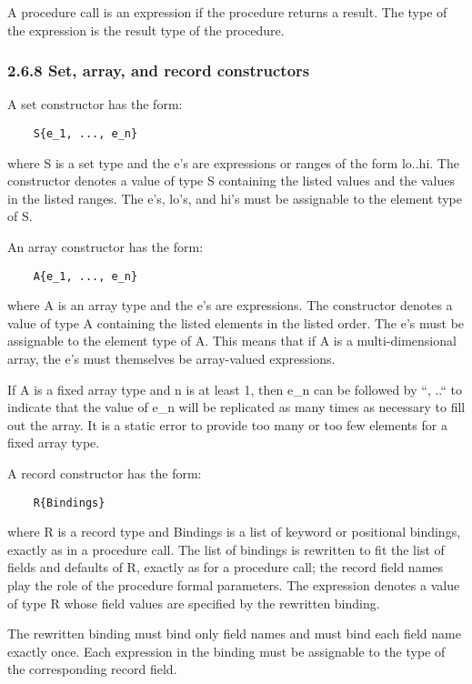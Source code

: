 \documentclass[10pt]{article}
\begin{document}
  A procedure call is an expression if the procedure returns a result. The type of the expression is the result type of the procedure. 


 
\subsubsection*{2.6.8 Set, array, and record constructors}


  A set constructor has the form: 
\begin{verbatim}
    S{e_1, ..., e_n}
\end{verbatim}
 where S is a set type and the e's are expressions or ranges of the form lo..hi. The constructor denotes a value of type S containing the listed values and the values in the listed ranges. The e's, lo's, and hi's must be assignable to the element type of S. 


 An array constructor has the form: 
\begin{verbatim}
    A{e_1, ..., e_n}
\end{verbatim}
 where A is an array type and the e's are expressions. The constructor denotes a value of type A containing the listed elements in the listed order. The e's must be assignable to the element type of A. This means that if A is a multi-dimensional array, the e's must themselves be array-valued expressions. 


  If A is a fixed array type and n is at least 1, then e\_n can be followed by ``, ..`` to indicate that the value of e\_n will be replicated as many times as necessary to fill out the array. It is a static error to provide too many or too few elements for a fixed array type. 


 A record constructor has the form: 
\begin{verbatim}
    R{Bindings}
\end{verbatim}
 where R is a record type and Bindings is a list of keyword or positional bindings, exactly as in a procedure call. The list of bindings is rewritten to fit the list of fields and defaults of R, exactly as for a procedure call; the record field names play the role of the procedure formal parameters. The expression denotes a value of type R whose field values are specified by the rewritten binding. 


  The rewritten binding must bind only field names and must bind each field name exactly once. Each expression in the binding must be assignable to the type of the corresponding record field. 
\end{document}
